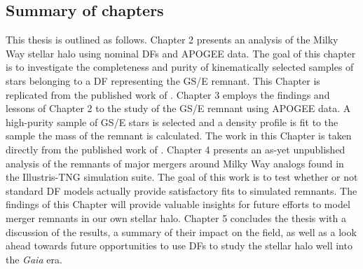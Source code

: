 \subsection{Summary of chapters}

This thesis is outlined as follows. Chapter 2 presents an analysis of the Milky Way stellar halo using nominal DFs and APOGEE data. The goal of this chapter is to investigate the completeness and purity of kinematically selected samples of stars belonging to a DF representing the GS/E remnant. This Chapter is replicated from the published work of \textcite{lane22}. Chapter 3 employs the findings and lessons of Chapter 2 to the study of the GS/E remnant using APOGEE data. A high-purity sample of GS/E stars is selected and a density profile is fit to the sample the mass of the remnant is calculated. The work in this Chapter is taken directly from the published work of \textcite{lane23}. Chapter 4 presents an as-yet unpublished analysis of the remnants of major mergers around Milky Way analogs found in the Illustris-TNG simulation suite. The goal of this work is to test whether or not standard DF models actually provide satisfactory fits to simulated remnants. The findings of this Chapter will provide valuable insights for future efforts to model merger remnants in our own stellar halo. Chapter 5 concludes the thesis with a discussion of the results, a summary of their impact on the field, as well as a look ahead towards future opportunities to use DFs to study the stellar halo well into the \textit{Gaia} era.

